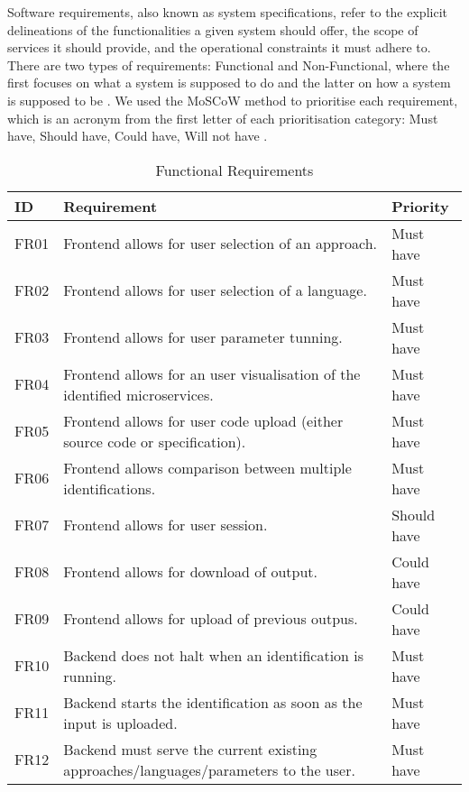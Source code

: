 Software requirements, also known as system specifications, refer to the
explicit delineations of the functionalities a given system should offer, the
scope of services it should provide, and the operational constraints it must
adhere to. There are two types of requirements: Functional and Non-Functional,
where the first focuses on what a system is supposed to do and the latter on
how a system is supposed to be \cite{wiegers2013software}. We used the MoSCoW
method to prioritise each requirement, which is an acronym from the first
letter of each prioritisation category: Must have, Should have, Could have,
Will not have \cite{brennan2009guide}.

\begin{table}[!htb] \caption{Functional Requirements} \label{tab:functional-requirements}
  \begin{center}
    \begin{tabular}[c]{p{4em}|p{16em}|p{6em}}
      \textbf{ID} &
      \textbf{Requirement} &
      \textbf{Priority} \\
      \hline FR01 & Frontend allows for user selection of an approach. & {Must have} \\
      \hline FR02 & Frontend allows for user selection of a language. & {Must have} \\
      \hline FR03 & Frontend allows for user parameter tunning. & {Must have} \\
      \hline FR04 & Frontend allows for an user visualisation of the identified microservices. & {Must have} \\
      \hline FR05 & Frontend allows for user code upload (either source code or specification). & {Must have} \\
      \hline FR06 & Frontend allows comparison between multiple identifications. & {Must have} \\
      \hline FR07 & Frontend allows for user session. & {Should have} \\
      \hline FR08 & Frontend allows for download of output. & {Could have} \\
      \hline FR09 & Frontend allows for upload of previous outpus. & {Could have} \\
      \hline FR10 & Backend does not halt when an identification is running. & {Must have} \\
      \hline FR11 & Backend starts the identification as soon as the input is uploaded. & {Must have} \\
      \hline FR12 & Backend must serve the current existing approaches/languages/parameters to the user. & {Must have} \\

\end{tabular}
\end{center}
\end{table}
